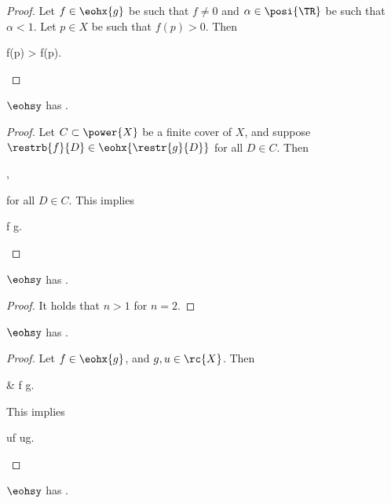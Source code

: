 \documentclass[b5paper, english, oneside]{memoir}
\begin{document}
\begin{proof}
Let $f \in \eohx{g}$ be such that $f \neq 0$ and $\alpha \in \posi{\TR}$ be such that $\alpha < 1$. Let $p \in X$ be such that $f(p) > 0$. Then
\begin{eqs}
f(p) > \alpha f(p).
\end{eqs}
\end{proof}

\begin{theorem}
\label{ElementwiseLocality}
$\eohsy$ has .
\end{theorem}

\begin{proof}
Let $C \subset \power{X}$ be a finite cover of $X$, and suppose $\restrb{f}{D} \in \eohx{\restr{g}{D}}$ for all $D \in C$. Then
\begin{eqs}
 \leq {},
\end{eqs}
for all $D \in C$. This implies
\begin{eqs}
f \leq g.
\end{eqs}
\end{proof}

\begin{theorem}
\label{ElementwiseOneSeparation}
$\eohsy$ has .
\end{theorem}

\begin{proof}
It holds that  $n > 1$ for $n = 2$. 
\end{proof}

\begin{theorem}
\label{ElementwiseSubHomogeneity}
$\eohsy$ has .  
\end{theorem}

\begin{proof}
Let $f \in \eohx{g}$, and $g, u \in \rc{X}$. Then
\begin{eqs}
{} & f \leq g.
\end{eqs}
This implies
\begin{eqs}
uf \leq ug.
\end{eqs}
  
\end{proof}

\begin{theorem}
\label{ElementwiseSubComposability}
$\eohsy$ has .
\end{theorem}
\end{document}
